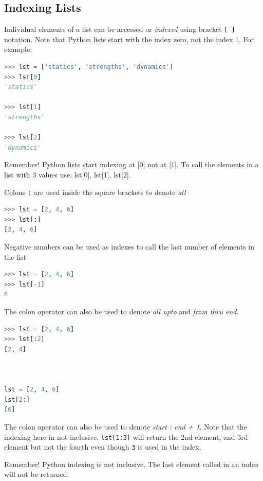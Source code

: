 \documentclass{book}
\begin{document}
    
        \subsection{Indexing Lists}\label{indexing-lists}

Individual elements of a list can be accessed or \emph{indexed} using
bracket \lstinline![ ]! notation. Note that Python lists start with the
index zero, not the index 1. For example:

\begin{lstlisting}[language=Python]
>>> lst = ['statics', 'strengths', 'dynamics']
>>> lst[0]
'statics'

>>> lst[1]
'strengths'

>>> lst[2]
'dynamics'
\end{lstlisting}

Remember! Python lists start indexing at {[}0{]} not at {[}1{]}. To call
the elements in a list with 3 values use: lst{[}0{]}, lst{[}1{]},
lst{[}2{]}.

Colons \lstinline!:! are used inside the square brackets to denote
\emph{all}

\begin{lstlisting}[language=Python]
>>> lst = [2, 4, 6]
>>> lst[:]
[2, 4, 6]
\end{lstlisting}

Negative numbers can be used as indexes to call the last number of
elements in the list

\begin{lstlisting}[language=Python]
>>> lst = [2, 4, 6]
>>> lst[-1]
6
\end{lstlisting}

The colon operator can also be used to denote \emph{all upto} and
\emph{from thru end}.

\begin{lstlisting}[language=Python]
>>> lst = [2, 4, 6]
>>> lst[:2]
[2, 4]



lst = [2, 4, 6]
lst[2:]
[6]
\end{lstlisting}

The colon operator can also be used to denote \emph{start : end + 1}.
Note that the indexing here in not inclusive. \lstinline!lst[1:3]! will
return the 2nd element, and 3rd element but not the fourth even though
\lstinline!3! is used in the index.

Remember! Python indexing is not inclusive. The last element called in
an index will not be returned.
    
\end{document}

